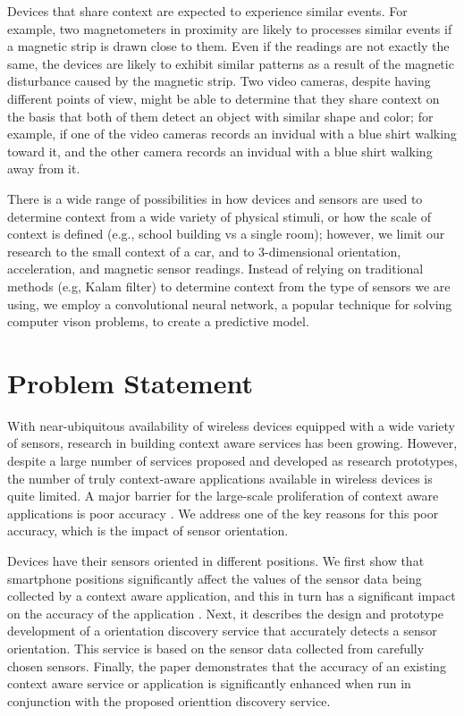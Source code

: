 \documentclass[journal]{IEEEtranTIE}
\begin{document}
Devices that share context are expected to experience similar events. For
example, two magnetometers in proximity are likely to processes similar events
if a magnetic strip is drawn close to them. Even if the readings are not exactly
the same, the devices are likely to exhibit similar patterns as a result of the
magnetic disturbance caused by the magnetic strip. Two video cameras, despite
having different points of view, might be able to determine that they share
context on the basis that both of them detect an object with similar shape and
color; for example, if one of the video cameras records an invidual with a blue
shirt walking toward it, and the other camera records an invidual with a blue
shirt walking away from it.

There is a wide range of possibilities in how devices and sensors are used to
determine context from a wide variety of physical stimuli, or how the scale of
context is defined (e.g., school building vs a single room); however, we limit
our research to the small context of a car, and to 3-dimensional orientation,
acceleration, and magnetic sensor readings. Instead of relying on traditional
methods (e.g, Kalam filter) to determine context from the type of sensors we are
using, we employ a convolutional neural network, a popular technique for solving
computer vison problems, to create a predictive model.

\section{Problem Statement}

With near-ubiquitous availability of wireless devices equipped with a wide
variety of sensors, research in building context aware services has been
growing. However, despite a large number of services proposed and developed as
research prototypes, the number of truly context-aware applications available in
wireless devices is quite limited. A major barrier for the large-scale
proliferation of context aware applications is poor accuracy \cite{Alanezi}.
We address one of the key reasons for this poor accuracy, which is the impact of
sensor orientation.

Devices have their sensors oriented in different positions. We first show that
smartphone positions significantly affect the values of the
sensor data being collected by a context aware application, and this in turn
has a significant impact on the accuracy of the application \cite{Alanezi}.
Next, it describes the design and prototype development of a orientation
discovery service that accurately detects a sensor orientation. This service is
based on the sensor data collected from carefully chosen sensors. Finally, the
paper demonstrates that the accuracy of an existing context aware service or
application is significantly enhanced when run in conjunction with the proposed
orienttion discovery service.
\end{document}
